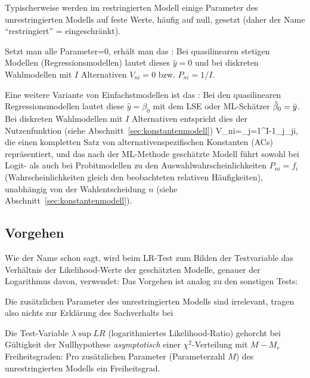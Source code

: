 \bi
\item Typischerweise werden im restringierten Modell einige Parameter
des unrestrin\-gier\-ten Modells auf feste Werte, h\"aufig auf null,
gesetzt (daher der Name ``restringiert'' = ein\-ge\-schr\"ankt).
\item Setzt man alle Parameter=0, erh\"alt man das
: Bei quasilinearen stetigen Modellen (Regressionsmodellen)
lautet dieses $\hat{y}=0$ und bei diskreten Wahlmodellen mit $I$ Alternativen
$V_{ni}=0$ bzw. $P_{ni}=1/I$.
\item Eine weitere Variante von Einfachstmodellen ist das
: Bei den quasilinearen Regressionsmodellen
lautet diese $\hat{y}=\beta_0$ mit dem LSE oder ML-Sch\"atzer
$\hat{\beta}_0=\bar{y}$. Bei diskreten Wahlmodellen mit $I$ Alternativen
entspricht dies der Nutzenfunktion (siehe Abschnitt~\ref{sec:konstantenmodell})
\be
\label{konstantenmodell1}
V_{ni}=\sum_{j=1}^{I-1}\beta_j\delta_{ji},
\ee
die einen kompletten Satz von alternativenspezifischen Konstanten (ACs)
repr\"asen\-tiert, und das nach der ML-Methode gesch\"atzte Modell
f\"uhrt sowohl bei 
Logit- als auch bei Probitmodellen zu den Auswahlwahrscheinlichkeiten
$P_{ni}=f_i$ (Wahrscheinlichkeiten gleich den beobachteten relativen
H\"aufigkeiten), unabh\"angig von der Wahlentscheidung $n$ (siehe Abschnitt~\ref{sec:konstantenmodell}).
\ei

\subsection{Vorgehen}

Wie der Name schon sagt, wird beim LR-Test zum Bilden der Testvariable
das
Verh\"altnis der Likelihood-Werte der gesch\"atzten Modelle, genauer der
Logarithmus davon, verwendet: Das Vorgehen ist analog zu den sonstigen
Tests:
\benum
\item {} Die zus\"atzlichen Parameter des
unrestringierten Modells sind irrelevant, tragen also nichts zur
Erkl\"arung des Sachverhalts bei

\item  {} 
Die Test-Variable $\lambda\sup{LR}$ (logarithmiertes Likeli\-hood-Ratio)
%
gehorcht bei G\"ultigkeit der Nullhypothese \emph{asymptotisch} einer
$\chi^2$-Verteilung mit  $M-M_r$ Freiheitsgraden: Pro zus\"atzlichen
Parameter (Parameterzahl $M$) des unrestringierten Modells ein
Freiheitsgrad. 

